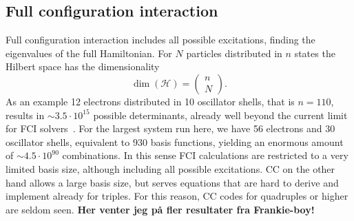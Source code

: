 \subsection{Full configuration interaction}
Full configuration interaction includes all possible excitations, finding the eigenvalues of the full Hamiltonian.
For $N$ particles distributed in $n$ states the Hilbert space has the dimensionality
\begin{equation}
\dim(\mathcal{H}) = 
\begin{pmatrix}
n \\ 
N
\end{pmatrix} .
\end{equation}
As an example 12 electrons distributed in 10 oscillator shells, that is $n=110$, results in $\sim 3.5 \cdot 10^{15}$ possible determinants, already well beyond the current limit for FCI solvers~\cite{PhysRevC.85.054301}.
For the largest system run here, we have 56 electrons and 30 oscillator shells, equivalent to $930$ basis functions, yielding an enormous amount of $\sim 4.5 \cdot 10^{90}$ combinations. 
In this sense FCI calculations are restricted to a very limited basis size, although including all possible excitations.
CC on the other hand allows a large basis size, but serves equations that are hard to derive and implement already for triples.
For this reason, CC codes for quadruples or higher are seldom seen.
{\bf Her venter jeg på fler resultater fra Frankie-boy!}
\label{sec:results:FCI}
